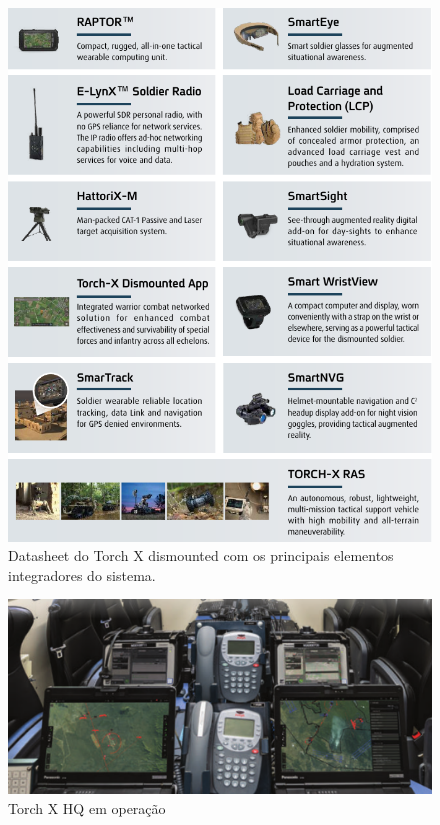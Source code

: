 \begin{figure}[!h]
    \centering
    \includegraphics[width=1\linewidth]{img/torchx_dismounted}
    \caption{Datasheet do Torch X dismounted com os principais elementos integradores do sistema.}
    \label{fig:torchxdismounted}
\end{figure}

\lipsum[25]

\begin{figure}[!h]
    \centering
    \includegraphics[width=1\linewidth]{img/torchx}
    \caption{Torch X HQ em operação}
    \label{fig:torchxhd}
\end{figure}

